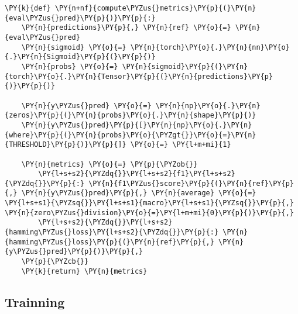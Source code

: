 \documentclass[../main.tex]{subfiles}
\begin{document}
    \begin{tcolorbox}[breakable, size=fbox, boxrule=1pt, pad at break*=1mm,colback=cellbackground, colframe=cellborder]
\begin{Verbatim}[commandchars=\\\{\}]
\PY{k}{def} \PY{n+nf}{compute\PYZus{}metrics}\PY{p}{(}\PY{n}{eval\PYZus{}pred}\PY{p}{)}\PY{p}{:}
    \PY{n}{predictions}\PY{p}{,} \PY{n}{ref} \PY{o}{=} \PY{n}{eval\PYZus{}pred}
    \PY{n}{sigmoid} \PY{o}{=} \PY{n}{torch}\PY{o}{.}\PY{n}{nn}\PY{o}{.}\PY{n}{Sigmoid}\PY{p}{(}\PY{p}{)}
    \PY{n}{probs} \PY{o}{=} \PY{n}{sigmoid}\PY{p}{(}\PY{n}{torch}\PY{o}{.}\PY{n}{Tensor}\PY{p}{(}\PY{n}{predictions}\PY{p}{)}\PY{p}{)}

    \PY{n}{y\PYZus{}pred} \PY{o}{=} \PY{n}{np}\PY{o}{.}\PY{n}{zeros}\PY{p}{(}\PY{n}{probs}\PY{o}{.}\PY{n}{shape}\PY{p}{)}
    \PY{n}{y\PYZus{}pred}\PY{p}{[}\PY{n}{np}\PY{o}{.}\PY{n}{where}\PY{p}{(}\PY{n}{probs}\PY{o}{\PYZgt{}}\PY{o}{=}\PY{n}{THRESHOLD}\PY{p}{)}\PY{p}{]} \PY{o}{=} \PY{l+m+mi}{1}

    \PY{n}{metrics} \PY{o}{=} \PY{p}{\PYZob{}}
        \PY{l+s+s2}{\PYZdq{}}\PY{l+s+s2}{f1}\PY{l+s+s2}{\PYZdq{}}\PY{p}{:} \PY{n}{f1\PYZus{}score}\PY{p}{(}\PY{n}{ref}\PY{p}{,} \PY{n}{y\PYZus{}pred}\PY{p}{,} \PY{n}{average} \PY{o}{=} \PY{l+s+s1}{\PYZsq{}}\PY{l+s+s1}{macro}\PY{l+s+s1}{\PYZsq{}}\PY{p}{,} \PY{n}{zero\PYZus{}division}\PY{o}{=}\PY{l+m+mi}{0}\PY{p}{)}\PY{p}{,}
        \PY{l+s+s2}{\PYZdq{}}\PY{l+s+s2}{hamming\PYZus{}loss}\PY{l+s+s2}{\PYZdq{}}\PY{p}{:} \PY{n}{hamming\PYZus{}loss}\PY{p}{(}\PY{n}{ref}\PY{p}{,} \PY{n}{y\PYZus{}pred}\PY{p}{)}\PY{p}{,}
    \PY{p}{\PYZcb{}}
    \PY{k}{return} \PY{n}{metrics}
\end{Verbatim}
\end{tcolorbox}

    \subsection{Trainning}\label{trainning}
\end{document}
